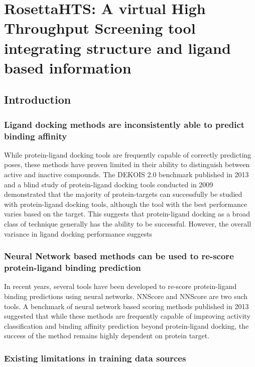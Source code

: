 \chapter{RosettaHTS: A virtual High Throughput Screening tool integrating structure and ligand based information}
\label{chap:rosetta_hts}
\section{Introduction}

\subsection{Ligand docking methods are inconsistently able to predict binding affinity}

While protein-ligand docking tools are frequently capable of correctly predicting poses\citep{Trott:2010km,Friesner:2004hm,Ewing:2001wu}, these methods have proven limited in their ability to distinguish between active and inactive compounds\citep{Bauer:2013de,Huang:2006gi,Davis:2009fx}.
The DEKOIS 2.0 benchmark published in 2013 \citep{Bauer:2013de} and a blind study of protein-ligand docking tools conducted in 2009\citep{Davis:2009fx} demonstrated that the majority of protein-targets can successfully be studied with protein-ligand docking tools, although the tool with the best performance varies based on the target.
This suggests that protein-ligand docking as a broad class of technique generally has the ability to be successful. 
However, the overall variance in ligand docking performance suggests 

\subsection{Neural Network based methods can be used to re-score protein-ligand binding prediction}

In recent years, several tools have been developed to re-score protein-ligand binding predictions using neural networks.
NNScore\citep{Durrant:2010js} and NNScore\citep{Durrant:2011dx} are two such tools.
A benchmark of neural network based scoring methods published in 2013 suggested that while these methods are frequently capable of improving activity classification and binding affinity prediction beyond protein-ligand docking, the success of the method remains highly dependent on protein target.\citep{Durrant:2013db}

\subsection{Existing limitations in training data sources}

